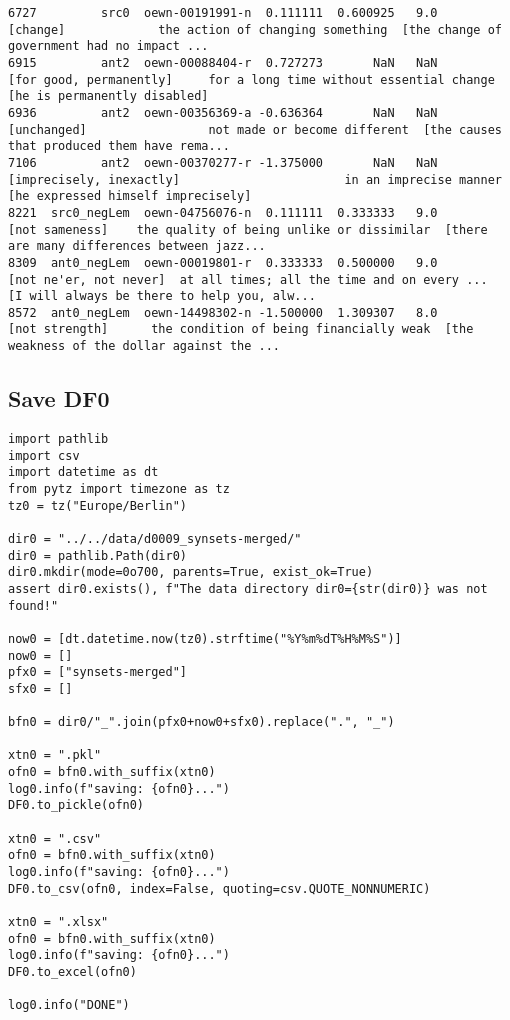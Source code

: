 \documentclass[a4paper,10pt,onecolumn,oneside,openright]{article}
\begin{document}
\begin{verbatim}
6727         src0  oewn-00191991-n  0.111111  0.600925   9.0                                     [change]             the action of changing something  [the change of government had no impact ...
6915         ant2  oewn-00088404-r  0.727273       NaN   NaN                      [for good, permanently]     for a long time without essential change                 [he is permanently disabled]
6936         ant2  oewn-00356369-a -0.636364       NaN   NaN                                  [unchanged]                 not made or become different  [the causes that produced them have rema...
7106         ant2  oewn-00370277-r -1.375000       NaN   NaN                     [imprecisely, inexactly]                       in an imprecise manner           [he expressed himself imprecisely]
8221  src0_negLem  oewn-04756076-n  0.111111  0.333333   9.0                               [not sameness]    the quality of being unlike or dissimilar  [there are many differences between jazz...
8309  ant0_negLem  oewn-00019801-r  0.333333  0.500000   9.0                       [not ne'er, not never]  at all times; all the time and on every ...  [I will always be there to help you, alw...
8572  ant0_negLem  oewn-14498302-n -1.500000  1.309307   8.0                               [not strength]      the condition of being financially weak  [the weakness of the dollar against the ...
\end{verbatim}

\subsection{Save DF0}
\label{sec:org64ec26e}
\begin{verbatim}
import pathlib
import csv
import datetime as dt
from pytz import timezone as tz
tz0 = tz("Europe/Berlin")

dir0 = "../../data/d0009_synsets-merged/"
dir0 = pathlib.Path(dir0)
dir0.mkdir(mode=0o700, parents=True, exist_ok=True)
assert dir0.exists(), f"The data directory dir0={str(dir0)} was not found!"

now0 = [dt.datetime.now(tz0).strftime("%Y%m%dT%H%M%S")]
now0 = []
pfx0 = ["synsets-merged"]
sfx0 = []

bfn0 = dir0/"_".join(pfx0+now0+sfx0).replace(".", "_")

xtn0 = ".pkl"
ofn0 = bfn0.with_suffix(xtn0)
log0.info(f"saving: {ofn0}...")
DF0.to_pickle(ofn0)

xtn0 = ".csv"
ofn0 = bfn0.with_suffix(xtn0)
log0.info(f"saving: {ofn0}...")
DF0.to_csv(ofn0, index=False, quoting=csv.QUOTE_NONNUMERIC)

xtn0 = ".xlsx"
ofn0 = bfn0.with_suffix(xtn0)
log0.info(f"saving: {ofn0}...")
DF0.to_excel(ofn0)

log0.info("DONE")
\end{verbatim}
\end{document}
